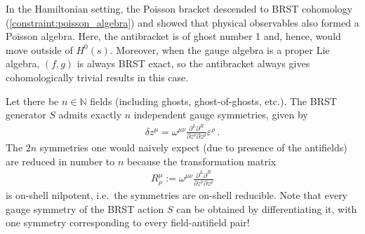     \begin{remark}
        In the Hamiltonian setting, the Poisson bracket descended to BRST cohomology (\cref{constraint:poisson_algebra}) and showed that physical observables also formed a Poisson algebra. Here, the antibracket is of ghost number 1 and, hence, would move outside of $H^0(s)$. Moreover, when the gauge algebra is a proper Lie algebra, $(f,g)$ is always BRST exact, so the antibracket always gives cohomologically trivial results in this case.
    \end{remark}

    \begin{property}
        Let there be $n\in\mathbb{N}$ fields (including ghosts, ghost-of-ghosts, etc.). The BRST generator $S$ admits exactly $n$ independent gauge symmetries, given by
        \begin{gather}
            \delta z^\mu = \omega^{\mu\nu}\frac{\partial^L\partial^R}{\partial z^\nu\partial z^\rho}\varepsilon^\rho\,.
        \end{gather}
        The $2n$ symmetries one would naively expect (due to presence of the antifields) are reduced in number to $n$ because the transformation matrix
        \begin{gather}
            R^\mu_\rho := \omega^{\mu\nu}\frac{\partial^L\partial^R}{\partial z^\nu\partial z^\rho}
        \end{gather}
        is on-shell nilpotent, i.e.~the symmetries are on-shell reducible. Note that every gauge symmetry of the BRST action $S$ can be obtained by differentiating it, with one symmetry corresponding to every field-antifield pair!
    \end{property}

